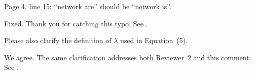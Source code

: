 \documentclass{ar2rc}
\begin{document}
\begin{reviewerblock}
\begin{reviewercomment}
\label{com3.1}
Page 4, line 15: ``network are'' should be ``network is''.
\end{reviewercomment}
\begin{reviewerresponse}
Fixed. Thank you for catching this typo. See .
\end{reviewerresponse}
\end{reviewerblock}

\begin{reviewerblock}
\begin{reviewercomment}
\label{com3.2}
Please also clarify the definition of $\lambda$ used in Equation~(5).
\end{reviewercomment}
\begin{reviewerresponse}
We agree. The same clarification addresses both Reviewer~2 and this comment.
See .
\end{reviewerresponse}
\end{reviewerblock}

\appendmainpaper
\end{document}
